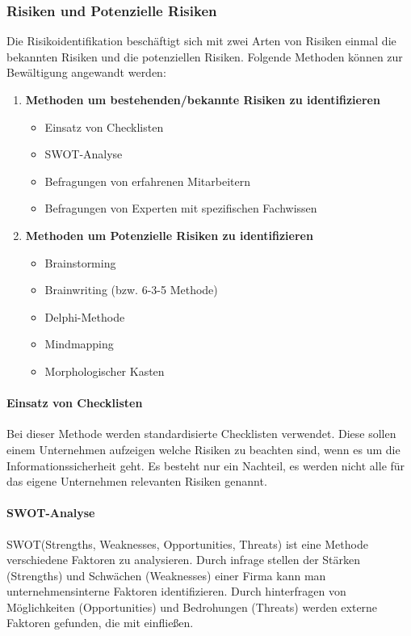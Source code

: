 \subsubsection{Risiken und Potenzielle Risiken}
Die Risikoidentifikation beschäftigt sich mit zwei Arten von Risiken einmal die bekannten Risiken und die potenziellen Risiken. Folgende Methoden können zur Bewältigung angewandt werden:
\begin{enumerate}
    \item \textbf{Methoden um bestehenden/bekannte Risiken zu identifizieren}
    \begin{itemize}
        \item Einsatz von Checklisten
        \item SWOT-Analyse
        \item Befragungen von erfahrenen Mitarbeitern
        \item Befragungen von Experten mit spezifischen Fachwissen
    \end{itemize}
    \item \textbf{Methoden um Potenzielle Risiken zu identifizieren}
    \begin{itemize}
    	\item Brainstorming
    	\item Brainwriting (bzw. 6-3-5 Methode)
    	\item Delphi-Methode
    	\item Mindmapping
    	\item Morphologischer Kasten
    \end{itemize}
\end{enumerate}

\paragraph{Einsatz von Checklisten}
Bei dieser Methode werden standardisierte Checklisten verwendet. Diese sollen einem Unternehmen aufzeigen welche Risiken zu beachten sind, wenn es um die Informationssicherheit geht. Es besteht nur ein Nachteil, es werden nicht alle für das eigene Unternehmen relevanten Risiken genannt.

\paragraph{SWOT-Analyse}
SWOT(Strengths, Weaknesses, Opportunities, Threats) ist eine Methode verschiedene Faktoren zu analysieren. 
Durch infrage stellen der Stärken (Strengths) und Schwächen (Weaknesses) einer Firma kann man unternehmensinterne Faktoren identifizieren.
Durch hinterfragen von Möglichkeiten (Opportunities) und Bedrohungen (Threats) werden externe Faktoren gefunden, die mit einfließen.


